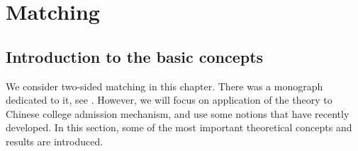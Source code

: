 
\chapter{Matching}  %

\label{Chapter4} %




\section{Introduction to the basic concepts}




 
 
We consider two-sided matching in this chapter. There was a monograph dedicated to it, see \parencite{Roth1990}. However, we will focus on application of the theory to Chinese college admission mechanism, and use some notions that have recently developed. In this section, some of the most important theoretical concepts and results are introduced. 

